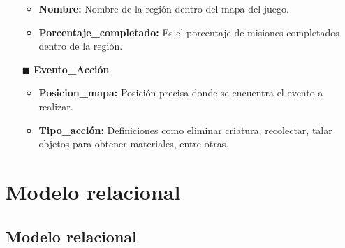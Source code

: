 \documentclass{report}
\begin{document}
\begin{itemize}
        \begin{itemize}
            \item \textbf{Nombre:} Nombre de la región dentro del mapa del juego.
            \item \textbf{Porcentaje\_completado:} Es el porcentaje de misiones completados dentro de la región.
        \end{itemize}
    \item[$\blacksquare$]\textbf{Evento\_Acción}
        \begin{itemize}
            \item \textbf{Posicion\_mapa: } Posición precisa donde se encuentra el evento a realizar.
            \item \textbf{Tipo\_acción:} Definiciones como eliminar criatura, recolectar, talar objetos para obtener materiales, entre otras.
        \end{itemize}
\end{itemize}

\chapter{Modelo relacional}
\section{Modelo relacional}
\end{document}
